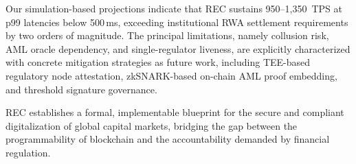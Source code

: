 \documentclass[journal,10pt,twocolumn]{IEEEtran}
\begin{document}
Our simulation-based projections indicate that REC sustains 950--1,350~TPS at p99 latencies below 500\,ms, exceeding institutional RWA settlement requirements by two orders of magnitude. The principal limitations, namely collusion risk, AML oracle dependency, and single-regulator liveness, are explicitly characterized with concrete mitigation strategies as future work, including TEE-based regulatory node attestation, zkSNARK-based on-chain AML proof embedding, and threshold signature governance.

REC establishes a formal, implementable blueprint for the secure and compliant digitalization of global capital markets, bridging the gap between the programmability of blockchain and the accountability demanded by financial regulation.



\end{document}
